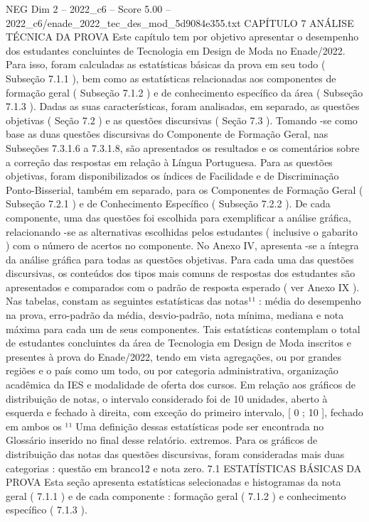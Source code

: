 \begin{textsample}{NEG Dim 2 – 2022\_c6 – Score 5.00 – 2022\_c6/enade\_2022\_tec\_des\_mod\_5d9084e355.txt}  \label{ex:f2_neg_303}
CAPÍTULO 7 ANÁLISE TÉCNICA DA PROVA Este capítulo tem por objetivo apresentar o desempenho dos estudantes concluintes de Tecnologia em Design de Moda no Enade/2022.
Para isso, foram calculadas as estatísticas básicas da prova em seu todo ( Subseção 7.1.1 ), bem como as estatísticas relacionadas aos componentes de formação geral ( Subseção 7.1.2 ) e de conhecimento específico da área ( Subseção 7.1.3 ).
Dadas as suas características, foram analisadas, em separado, as questões objetivas ( Seção 7.2 ) e as questões discursivas ( Seção 7.3 ).
Tomando -se como base as duas questões discursivas do Componente de Formação Geral, nas Subseções 7.3.1.6 a 7.3.1.8, são apresentados os resultados e os comentários sobre a correção das respostas em relação à Língua Portuguesa.
Para as questões objetivas, foram disponibilizados os índices de Facilidade e de Discriminação Ponto-Bisserial, também em separado, para os Componentes de Formação Geral ( Subseção 7.2.1 ) e de Conhecimento Específico ( Subseção 7.2.2 ).
De cada componente, uma das questões foi escolhida para exemplificar a análise gráfica, relacionando -se as alternativas escolhidas pelos estudantes ( inclusive o gabarito ) com o número de acertos no componente.
No Anexo IV, apresenta -se a íntegra da análise gráfica para todas as questões objetivas.
Para cada uma das questões discursivas, os conteúdos dos tipos mais comuns de respostas dos estudantes são apresentados e comparados com o padrão de resposta esperado ( ver Anexo IX ).
Nas tabelas, constam as seguintes estatísticas das notas¹¹ : média do desempenho na prova, erro-padrão da média, desvio-padrão, nota mínima, mediana e nota máxima para cada um de seus componentes.
Tais estatísticas contemplam o total de estudantes concluintes da área de Tecnologia em Design de Moda inscritos e presentes à prova do Enade/2022, tendo em vista agregações, ou por grandes regiões e o país como um todo, ou por categoria administrativa, organização acadêmica da IES e modalidade de oferta dos cursos.
Em relação aos gráficos de distribuição de notas, o intervalo considerado foi de 10 unidades, aberto à esquerda e fechado à direita, com exceção do primeiro intervalo, [ 0 ; 10 ], fechado em ambos os ¹¹ Uma definição dessas estatísticas pode ser encontrada no Glossário inserido no final desse relatório. extremos.
Para os gráficos de distribuição das notas das questões discursivas, foram consideradas mais duas categorias : questão em branco12 e nota zero. 7.1 ESTATÍSTICAS BÁSICAS DA PROVA Esta seção apresenta estatísticas selecionadas e histogramas da nota geral ( 7.1.1 ) e de cada componente : formação geral ( 7.1.2 ) e conhecimento específico ( 7.1.3 ).

\end{textsample}
